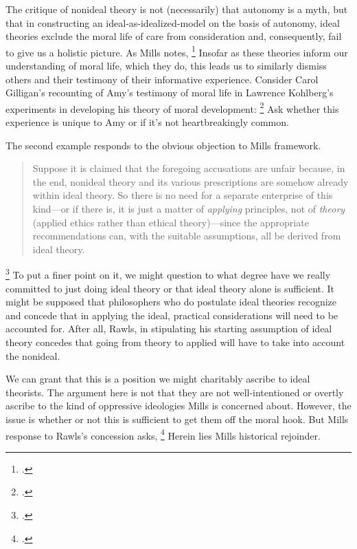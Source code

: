 \documentclass[letterpaper,notitlepage,12pt]{article}
\begin{document}
The critique of nonideal theory is not (necessarily) that autonomy is a myth, 
but that in constructing an ideal-as-idealized-model on the basis of autonomy,
ideal theories exclude the moral life of care from consideration and,
consequently, fail to give us a holistic picture.
As Mills notes, \footcite[p.
177]{mills_ideal_2005}
Insofar as these theories inform our understanding of moral life, which they do,
this leads us to similarly dismiss others and their testimony of their
informative experience.
Consider Carol Gilligan's recounting of Amy's testimony of moral life in
Lawrence Kohlberg's experiments in developing his theory of moral development:
\footcite[p.
29]{gilligan_different_1993}
Ask whether this experience is unique to Amy or if it's not heartbreakingly
common.

The second example responds to the obvious objection to Mills framework.
\blockquote{Suppose it is claimed that the
  foregoing accusations are unfair because, in the end, nonideal theory and its
  various prescriptions are somehow already  within ideal
  theory. So there is no need for a separate enterprise of this kind---or if
  there is, it is just a matter of \textit{applying} principles, not of
\textit{theory} (applied ethics rather than ethical theory)---since the
appropriate recommendations can, with the suitable assumptions, all be derived
from ideal theory.}\footcite[p. 177]{mills_ideal_2005}
To put a finer point on it, we might question to what degree have we really
committed to just doing ideal theory or that ideal theory alone is sufficient.
It might be supposed that philosophers who do postulate ideal theories recognize
and concede that in applying the ideal, practical considerations will need to be
accounted for.
After all, Rawls, in stipulating his starting assumption of ideal theory
concedes that going from theory to applied will have to take into account the
nonideal.

We can grant that this is a position we might charitably ascribe to ideal
theorists.
The argument here is not that they are not well-intentioned or overtly ascribe
to the kind of oppressive ideologies Mills is concerned about.
However, the issue is whether or not this is sufficient to get them off the
moral hook.
But Mills response to Rawls's concession asks, \footcite[p.
179]{mills_ideal_2005}
Herein lies Mills historical rejoinder.
\end{document}
